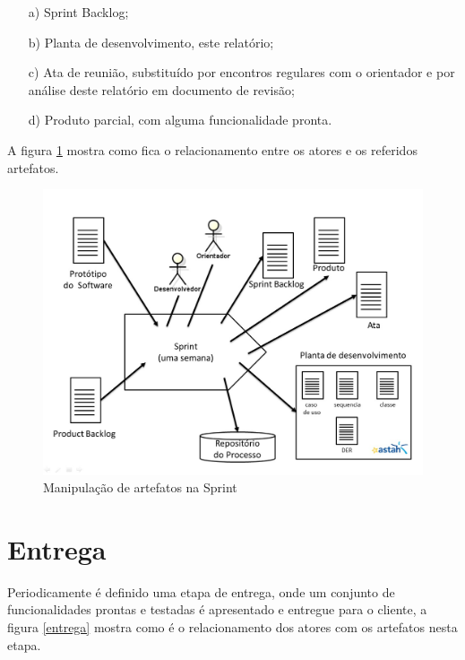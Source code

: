 \begin{itemize}
    \item[a)] Sprint Backlog;
    \item[b)] Planta de desenvolvimento, este relatório;
    \item[c)] Ata de reunião, substituído por encontros regulares com o orientador e por análise deste relatório em documento de revisão;
    \item[d)] Produto parcial, com alguma funcionalidade pronta.
\end{itemize}

A figura \ref{requisitos} mostra como fica o relacionamento entre os atores e os referidos artefatos.

\begin{figure}[H]
\caption{\label{requisitos} Manipulação de artefatos na Sprint}
\includegraphics[scale=0.33]{img/sprints.jpg}
\end{figure}

\section{Entrega}
Periodicamente é definido uma etapa de entrega, onde um conjunto de funcionalidades prontas e testadas é apresentado e entregue para o cliente, a figura \ref{entrega} mostra como é o relacionamento dos atores com os artefatos nesta etapa.

